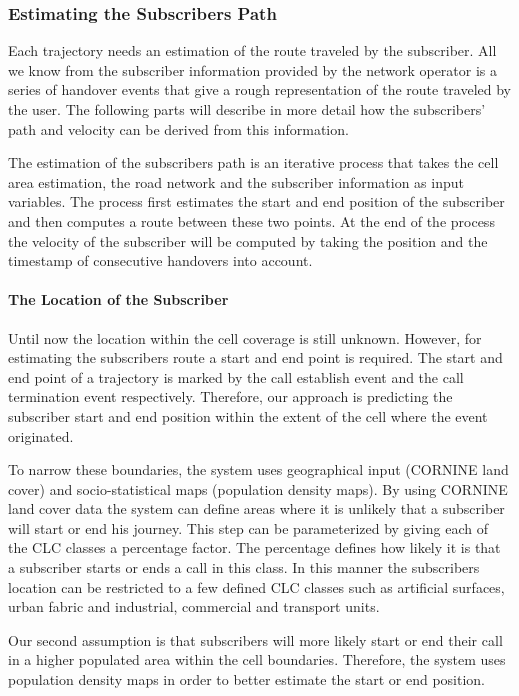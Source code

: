\documentclass[twocolumn]{bmcart}%
\begin{document}
\subsubsection*{Estimating the Subscribers Path}
Each trajectory needs an estimation of the route traveled by the subscriber. All we know from the subscriber information provided by the network operator is a series of handover events that give a rough representation of the route traveled by the user. The following parts will describe in more detail how the subscribers' path and velocity can be derived from this information.

The estimation of the subscribers path is an iterative process that takes the cell area estimation, the road network and the subscriber information as input variables. The process first estimates the start and end position of the subscriber and then computes a route between these two points. At the end of the process the velocity of the subscriber will be computed by taking the position and the timestamp of consecutive handovers into account.

\paragraph{The Location of the Subscriber}
Until now the location within the cell coverage is still unknown. However, for estimating the subscribers route a start and end point is required. The start and end point of a trajectory is marked by the call establish event and the call termination event respectively. Therefore, our approach is predicting the subscriber start and end position within the extent of the cell where the event originated. 

To narrow these boundaries, the system uses geographical input (CORNINE
land cover) and socio-statistical maps (population density maps).
By using CORNINE land cover data the system can define areas where
it is unlikely that a subscriber will start or end his journey. This step can be
parameterized by giving each of the CLC classes a percentage factor. The
percentage defines how likely it is that a subscriber starts or ends a call in
this class. In this manner the subscribers location can be restricted to a few defined CLC classes such as 	artificial surfaces, urban fabric and industrial, commercial and transport units. 

Our second assumption is that subscribers will more likely start or end
their call in a higher populated area within the cell boundaries. Therefore,
the system uses population density maps in order to better estimate the
start or end position.
\end{document}
